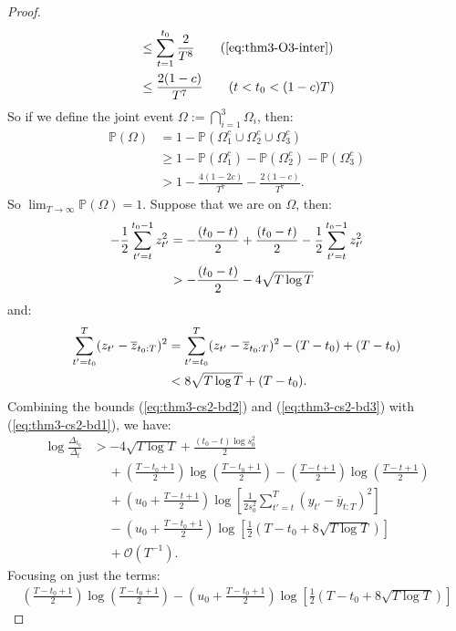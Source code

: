 \begin{proof}
\begin{align*}
    &\leq \sum_{t=1}^{t_0} \frac{2}{T^8} \tag{\ref{eq:thm3-O3-inter}} \\
    &\leq \frac{2(1-c)}{T^7} \tag{$t < t_0 < (1-c)T$}
\end{align*}
So if we define the joint event $\Omega := \bigcap_{i=1}^3 \Omega_i$, then:
\begin{align*}
    \mathbb{P}(\Omega) &= 1 - \mathbb{P}(\Omega^c_1 \cup \Omega^c_2 \cup \Omega^c_3) \\
    &\geq 1 - \mathbb{P}(\Omega^c_1) - \mathbb{P}(\Omega^c_2) - \mathbb{P}(\Omega^c_3) \tag{union bound} \\
    &> 1 - \frac{4(1-2c)}{T^7} - \frac{2(1-c)}{T^7}.
\end{align*}
So $\lim_{T\to\infty} \mathbb{P}(\Omega)  = 1$. Suppose that we are on $\Omega$, then:
\begin{align}
     - \frac{1}{2} \sum_{t' = t}^{t_0 - 1} z_{t'}^2 &= - \frac{(t_0 - t)}{2} + \frac{(t_0 - t)}{2} - \frac{1}{2} \sum_{t' = t}^{t_0 - 1} z_{t'}^2 \notag \\
     &> - \frac{(t_0 - t)}{2} - 4\sqrt{T\log T} \label{eq:thm3-cs2-bd2}
\end{align}
and:
\begin{align}
    \sum_{t'=t_0}^T  (z_{t'} - \overline{z}_{t_0:T})^2 &= \sum_{t'=t_0}^T  (z_{t'} - \overline{z}_{t_0:T})^2 - (T - t_0) + (T-t_0) \notag \\
    &< 8\sqrt{T \log T} + (T - t_0). \label{eq:thm3-cs2-bd3}
\end{align}
Combining the bounds (\ref{eq:thm3-cs2-bd2}) and (\ref{eq:thm3-cs2-bd3}) with (\ref{eq:thm3-cs2-bd1}), we have:
\begin{align*}
    \log \frac{\Delta_{t_0}}{\Delta_t} &> -4\sqrt{T \log T} + \frac{(t_0 - t)\log s_0^2}{2} \\
    &\quad\: + \left(\frac{T - t_0 + 1}{2}\right) \log\left(\frac{T-t_0+1}{2}\right) - \left(\frac{T - t + 1}{2}\right) \log\left(\frac{T-t+1}{2}\right) \\
    &\quad\: + \left(u_0 + \frac{T - t +1}{2}\right)\log\left[ \frac{1}{2s_0^2}\sum_{t'=t}^T (y_{t'} - \overline{y}_{t:T})^2 \right] \\
    &\quad\: - \left(u_0 + \frac{T - t_0 +1}{2}\right)\log\left[\frac{1}{2}(T-t_0 +8\sqrt{T \log T})\right] \\
    &\quad\: +  \mathcal{O}(T^{-1}). 
\end{align*}
Focusing on just the terms:
\begin{align*}
    \left(\frac{T - t_0 + 1}{2}\right) \log\left(\frac{T-t_0+1}{2}\right) - \left(u_0 + \frac{T - t_0 +1}{2}\right)\log\left[\frac{1}{2}(T-t_0 +8\sqrt{T \log T})\right]

\end{align*}
\end{proof}
